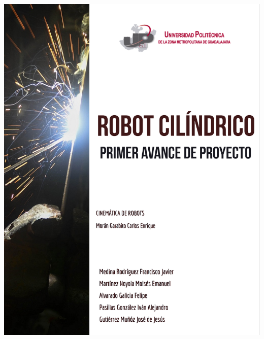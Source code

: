 \documentclass[12pt,letterpaper]{article}
\date{}
\begin{document}
\includegraphics[scale=.2]{imagenes/Portada.png} \\\\
\end{document}
